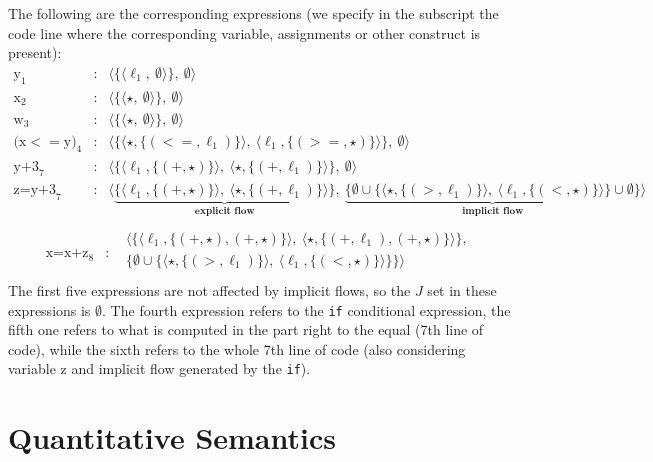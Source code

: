 \documentclass{llncs}
\newcommand{\blangle}{\big\langle}
\newcommand{\brangle}{\big\rangle}
\begin{document}
\noindent The following are the corresponding expressions (we specify in the subscript the code line where the corresponding variable, assignments or other construct is present):
{\footnotesize \[
\begin{array}{ccl}
\mbox{y}_{1} &:& \blangle\{\langle \ell_1,\ \emptyset\rangle\},\ \emptyset\brangle\\
\mbox{x}_{2} &:& \blangle\{\langle \star,\ \emptyset\rangle\},\ \emptyset\brangle\\
\mbox{w}_{3} &:& \blangle\{\langle \star,\ \emptyset\rangle\},\ \emptyset\brangle\\
\mbox{(x$<=$y)}_{4} &:& \blangle\{\langle\star,\{(<=,\ell_1)\}\rangle,\ \langle \ell_1, \{(>=,\star)\}\rangle\},\ \emptyset\brangle\\
\mbox{y+3}_{7} &:& \blangle\{\langle \ell_1,\{(+,\star)\}\rangle,\ \langle \star, \{(+,\ell_1)\}\rangle\},\ \emptyset\brangle\\
\mbox{z=y+3}_{7} &:& \blangle\underbrace{\{\langle \ell_1,\{(+,\star)\}\rangle,\ \langle \star, \{(+, \ell_1)\}\rangle\}}_\textbf{explicit flow},\ \underbrace{\{\emptyset\cup\{\langle\star,\{(>, \ell_1)\}\rangle,\ \langle \ell_1, \{(<,\star)\}\rangle\}\cup\emptyset\} }_\textbf{implicit flow}\brangle\\
\end{array}\]
\[
\begin{array}{ccl}
\mbox{x=x+z}_{8} &:&
\begin{array}{l}
 \blangle\{\langle \ell_1,\{(+,\star),(+,\star)\}\rangle,\ \langle \star, \{(+,\ell_1),(+,\star)\}\rangle\},\\ \{\emptyset\cup\{\langle\star,\{(>,\ell_1)\}\rangle,\ \langle \ell_1, \{(<,\star)\}\rangle\}\} \brangle\\
\end{array}
\end{array}
\]}
The first five expressions are not affected by implicit flows, so the $J$ set in these expressions is $\emptyset$. The fourth expression refers to the \texttt{if} conditional expression, the fifth one refers to what is computed in the part right to the equal (7th line of code), while the sixth refers to the whole 7th line of code (also considering variable z and implicit flow generated by the \texttt{if}).\\

\section{Quantitative Semantics}
\end{document}
